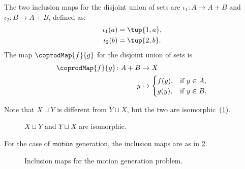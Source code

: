 \begin{example}
The two inclusion maps for the disjoint union of sets are $\iota_1\colon A \to A + B$ and $\iota_2\colon B \to A + B$, defined as:
\begin{equation}
\begin{aligned}
    \iota_1(a) &= \tup{1, a},\\
    \iota_2(b) &= \tup{2, b}.
\end{aligned}
\end{equation}
The map $\coprodMap{f}{g}$ for the disjoint union of sets is
\begin{equation}
\begin{aligned}
    \coprodMap{f}{g} \colon  A + B &\to X \\
    y &   \mapsto
    \begin{cases}
        f(y), & \text{if } y \in A, \\
        g(y), & \text{if } y \in B.
    \end{cases}
\end{aligned}
\end{equation}
\end{example}
\noindent Note that $X \sqcup Y$ is different from $Y \sqcup X$, but the two are isomorphic~(\cref{fig:e16}).

\begin{figure}[h!]
    \centering
    \caption{$X \sqcup Y$ and $Y \sqcup X$ are isomorphic. \label{fig:e16}}
\end{figure}
For the case of $\mathsf{motion}$ generation, the inclusion maps are as in \cref{fig:inclusiongas}.

\begin{figure}[h!]
    \centering
    \caption{Inclusion maps for the motion generation problem. \label{fig:inclusiongas}}
\end{figure}
